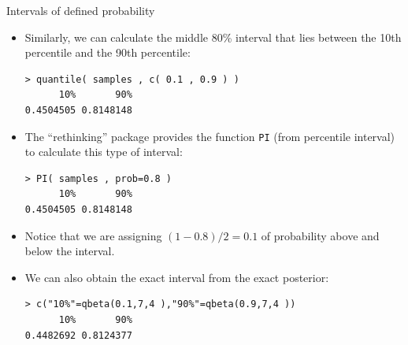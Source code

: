 \documentclass[handout]{beamer}
\begin{document}
\begin{frame}[fragile]{Intervals of defined probability}
\scriptsize{
\begin{itemize}

\item Similarly, we can calculate the middle 80\% interval that lies between the 10th percentile and the 90th percentile: 


\begin{verbatim}
> quantile( samples , c( 0.1 , 0.9 ) )
      10%       90% 
0.4504505 0.8148148 
\end{verbatim}



\item The ``rethinking'' package provides the function \verb+PI+ (from percentile interval) to calculate this type of interval:

\begin{verbatim}
> PI( samples , prob=0.8 )
      10%       90% 
0.4504505 0.8148148 
\end{verbatim}

\item Notice that we are assigning $(1-0.8)/2=0.1$ of probability above and below the interval.

\item We can also obtain the exact interval from the exact posterior:


\begin{verbatim}
> c("10%"=qbeta(0.1,7,4 ),"90%"=qbeta(0.9,7,4 ))
      10%       90% 
0.4482692 0.8124377 
\end{verbatim}

\end{itemize}


} 

\end{frame}
\end{document}
